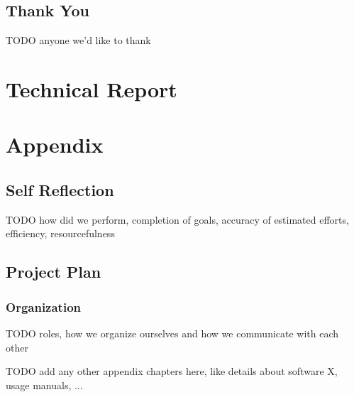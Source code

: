 \documentclass[a4paper]{report}
\begin{document}
\chapter*{Thank You}
TODO anyone we'd like to thank




\tableofcontents
\listoffigures
\listoftables
\lstlistoflistings

\pagebreak
{}
\setcounter{page}{1}
\setcounter{secnumdepth}{3}
\part{Technical Report}




\printbibliography

\appendix
\part{Appendix}
\chapter{Self Reflection}
TODO how did we perform, completion of goals, accuracy of estimated efforts, efficiency, resourcefulness

\chapter{Project Plan}

\section{Organization}
TODO roles, how we organize ourselves and how we communicate with each other



TODO add any other appendix chapters here, like details about software X, usage manuals, ...\\
\end{document}
